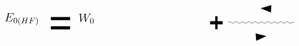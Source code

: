 \begin{equation}
\begin{tikzpicture}[x=0.75pt,y=0.75pt,yscale=-1,xscale=1]
\draw  [fill={rgb, 255:red, 0; green, 0; blue, 0 }  ,fill opacity=1 ] (429.6,102.6) -- (445.47,97.82) -- (444.89,109.01) -- cycle ;
\draw  [fill={rgb, 255:red, 0; green, 0; blue, 0 }  ,fill opacity=1 ] (437.37,147.3) -- (422.33,154.28) -- (421.33,143.12) -- cycle ;
\draw    (378,125.3) .. controls (379.67,123.63) and (381.33,123.63) .. (383,125.3) .. controls (384.67,126.97) and (386.33,126.97) .. (388,125.3) .. controls (389.67,123.63) and (391.33,123.63) .. (393,125.3) .. controls (394.67,126.97) and (396.33,126.97) .. (398,125.3) .. controls (399.67,123.63) and (401.33,123.63) .. (403,125.3) .. controls (404.67,126.97) and (406.33,126.97) .. (408,125.3) .. controls (409.67,123.63) and (411.33,123.63) .. (413,125.3) .. controls (414.67,126.97) and (416.33,126.97) .. (418,125.3) .. controls (419.67,123.63) and (421.33,123.63) .. (423,125.3) .. controls (424.67,126.97) and (426.33,126.97) .. (428,125.3) .. controls (429.67,123.63) and (431.33,123.63) .. (433,125.3) .. controls (434.67,126.97) and (436.33,126.97) .. (438,125.3) .. controls (439.67,123.63) and (441.33,123.63) .. (443,125.3) .. controls (444.67,126.97) and (446.33,126.97) .. (448,125.3) .. controls (449.67,123.63) and (451.33,123.63) .. (453,125.3) .. controls (454.67,126.97) and (456.33,126.97) .. (458,125.3) .. controls (459.67,123.63) and (461.33,123.63) .. (463,125.3) .. controls (464.67,126.97) and (466.33,126.97) .. (468,125.3) .. controls (469.67,123.63) and (471.33,123.63) .. (473,125.3) .. controls (474.67,126.97) and (476.33,126.97) .. (478,125.3) -- (481.2,125.3) -- (481.2,125.3) ;
\draw  [fill={rgb, 255:red, 0; green, 0; blue, 0 }  ,fill opacity=1 ] (358.01,115.6) -- (361.19,115.6) -- (361.19,123.61) -- (369.2,123.61) -- (369.2,127.99) -- (361.19,127.99) -- (361.19,136) -- (358.01,136) -- (358.01,127.99) -- (350,127.99) -- (350,123.61) -- (358.01,123.61) -- cycle ;
\draw [line width=3.75]    (100,119) -- (130.2,119) ;
\draw [line width=3.75]    (100,134) -- (130.2,134) ;

\draw (142,110) node [anchor=north west][inner sep=0.75pt]  [font=\Large]  {$W_{0}$};
\draw (26,109) node [anchor=north west][inner sep=0.75pt]  [font=\Large]  {$E_{0( HF)}$};


\end{tikzpicture}
\end{equation}
